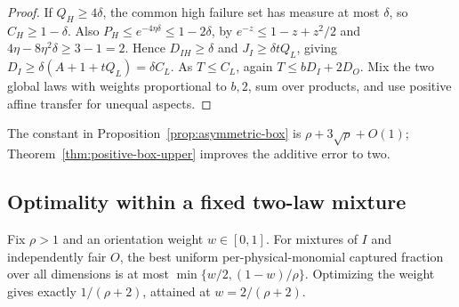 \begin{proof}
If $Q_H\ge4\delta$, the common high failure set has measure at most
$\delta$, so $C_H\ge1-\delta$. Also
$P_H\le e^{-4\eta\delta}\le1-2\delta$, by
$e^{-z}\le1-z+z^2/2$ and $4\eta-8\eta^2\delta\ge3-1=2$.
Hence $D_{IH}\ge\delta$ and $J_I\ge\delta tQ_L$, giving
$D_I\ge\delta(A+1+tQ_L)=\delta C_L$.
As $T\le C_L$, again $T\le bD_I+2D_O$.
Mix the two global laws with weights proportional to $b,2$, sum over
products, and use positive affine transfer for unequal aspects.
\end{proof}
The constant in Proposition~\ref{prop:asymmetric-box} is
$\rho+3\sqrt\rho+O(1)$; Theorem~\ref{thm:positive-box-upper} improves
the additive error to two.

\subsection{Optimality within a fixed two-law mixture}
\begin{proposition}
\label{prop:fixed-mixture-optimal}
Fix $\rho>1$ and an orientation weight $w\in[0,1]$. For mixtures of
$I$ and independently fair $O$, the best uniform per-physical-monomial
captured fraction over all dimensions is at most
$\min\{w/2,(1-w)/\rho\}$. Optimizing the weight gives exactly
$1/(\rho+2)$, attained at $w=2/(\rho+2)$.
\end{proposition}
